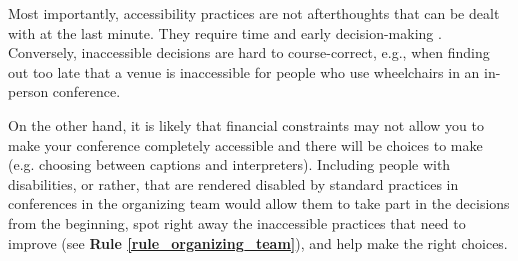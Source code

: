 \documentclass[10pt,letterpaper]{article}
\begin{document}

 
Most importantly, accessibility practices are not afterthoughts that can be dealt with at the last minute. 
They require time and early decision-making \cite{irishIncreasingParticipationUsing2020}. 
Conversely, inaccessible decisions are hard to course-correct, e.g., when finding out too late that a venue is inaccessible for people who use wheelchairs in an in-person conference. 

On the other hand, it is likely that financial constraints may not allow you to make your conference completely accessible and there will be choices to make (e.g. choosing between captions and interpreters). 
Including people with disabilities, or rather, that are rendered disabled by standard practices in conferences in the organizing team would allow them to take part in the decisions from the beginning, spot right away the inaccessible practices that need to improve (see \textbf{Rule \ref{rule_organizing_team}}), and help make the right choices.

\end{document}
